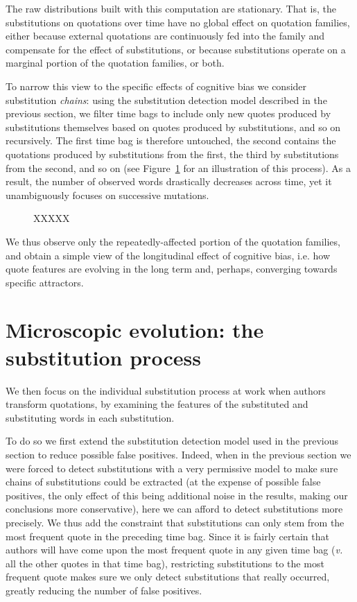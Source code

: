 The raw distributions built with this computation are stationary.
That is, the substitutions on quotations over time have no global effect on quotation families, either because external quotations are continuously fed into the family and compensate for the effect of substitutions, or because substitutions operate on a marginal portion of the quotation families, or both.

\bigskip
To narrow this view to the specific effects of cognitive bias we consider substitution \emph{chains}: using the substitution detection model described in the previous section, we filter time bags to include only new quotes produced by substitutions themselves based on quotes produced by substitutions, and so on recursively.
The first time bag is therefore untouched, the second contains the quotations produced by substitutions from the first, the third by substitutions from the second, and so on (see Figure~\ref{fig:substitution-chains} for an illustration of this process).
As a result, the number of observed words drastically decreases across time, yet it unambiguously focuses on successive mutations.

\begin{figure}[h]
    \centering
    \def\svgwidth{\linewidth}
    \tiny
    
    \caption{XXXXX}
    \label{fig:substitution-chains}
\end{figure}

We thus observe only the repeatedly-affected portion of the quotation families, and obtain a simple view of the longitudinal effect of cognitive bias, \hbox{i.e.} how quote features are evolving in the long term and, perhaps, converging towards specific attractors.


\section{Microscopic evolution: the substitution process}

We then focus on the individual substitution process at work when authors transform quotations, by examining the features of the substituted and substituting words in each substitution. 

To do so we first extend the substitution detection model used in the previous section to reduce possible false positives.
Indeed, when in the previous section we were forced to detect substitutions with a very permissive model to make sure chains of substitutions could be extracted (at the expense of possible false positives, the only effect of this being additional noise in the results, making our conclusions more conservative), here we can afford to detect substitutions more precisely.
We thus add the constraint that substitutions can only stem from the most frequent quote in the preceding time bag.
Since it is fairly certain that authors will have come upon the most frequent quote in any given time bag (\emph{v.} all the other quotes in that time bag), restricting substitutions to the most frequent quote makes sure we only detect substitutions that really occurred, greatly reducing the number of false positives.

